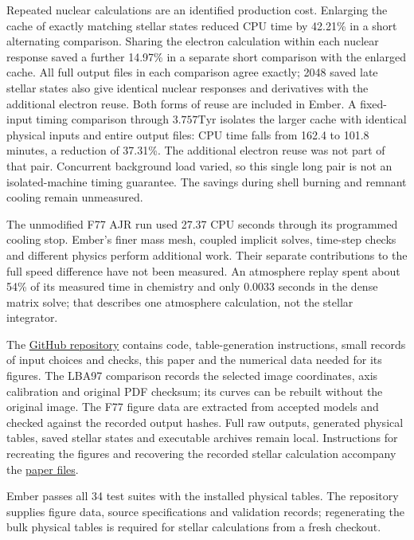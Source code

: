 \documentclass[11pt,letterpaper]{article}
\newcommand{\Tyr}{\mathrm{Tyr}}
\newcommand{\doc}[2]{\href{https://github.com/oklo/ember/blob/codex/atmosphere5000-density-checks/#1}{#2}}
\begin{document}
Repeated nuclear calculations are an identified production cost. Enlarging the
cache of exactly matching stellar states reduced CPU time by 42.21\% in a
short alternating comparison. Sharing the electron calculation within each
nuclear response saved a further 14.97\% in a separate short comparison with
the enlarged cache. All full output files in each comparison agree exactly;
2048 saved late stellar states also give identical nuclear responses and
derivatives with the additional electron reuse. Both forms of reuse are included in Ember.
A fixed-input timing comparison through $3.757\Tyr$ isolates the larger cache with identical
physical inputs and entire output files: CPU time falls from 162.4 to 101.8
minutes, a reduction of 37.31\%. The additional electron reuse was not part
of that pair. Concurrent background load varied, so this single long pair is not
an isolated-machine timing guarantee. The savings during shell burning and
remnant cooling remain unmeasured.

The unmodified F77 AJR run used 27.37 CPU seconds through its programmed
cooling stop. Ember's finer mass mesh, coupled implicit solves, time-step checks
and different physics perform additional work. Their separate contributions
to the full speed difference have not been measured. An atmosphere
replay spent about 54\% of its measured time in chemistry and only 0.0033 seconds
in the dense matrix solve; that describes one atmosphere calculation, not
the stellar integrator.

The \href{https://github.com/oklo/ember}{GitHub repository} contains code,
table-generation instructions, small records of input choices and checks,
this paper and the numerical data needed for its figures. The LBA97 comparison
records the selected image coordinates, axis calibration and original PDF
checksum; its curves can be rebuilt without the original image. The F77 figure data
are extracted from accepted models and checked against the recorded output
hashes. Full raw outputs, generated physical tables, saved stellar states and
executable archives remain local. Instructions for recreating the figures
and recovering the recorded stellar calculation accompany the
\doc{docs/reports/2026-09-11/README.md}{paper files}.

Ember passes all 34 test suites with the installed physical tables. The
repository supplies figure data, source specifications and validation records;
regenerating the bulk physical tables is required for stellar calculations
from a fresh checkout.
\end{document}
